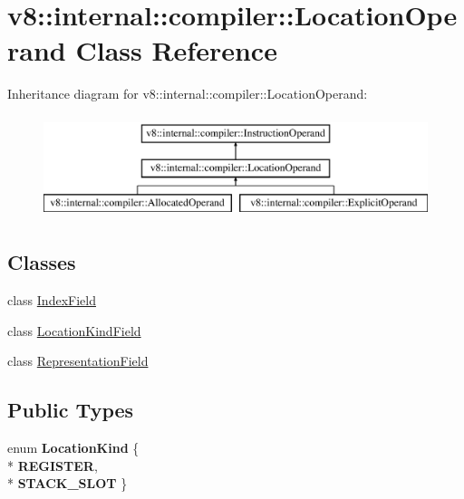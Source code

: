 \hypertarget{classv8_1_1internal_1_1compiler_1_1_location_operand}{}\section{v8\+:\+:internal\+:\+:compiler\+:\+:Location\+Operand Class Reference}
\label{classv8_1_1internal_1_1compiler_1_1_location_operand}
Inheritance diagram for v8\+:\+:internal\+:\+:compiler\+:\+:Location\+Operand\+:\begin{figure}[H]
\begin{center}
\leavevmode
\includegraphics[height=3.000000cm]{classv8_1_1internal_1_1compiler_1_1_location_operand}
\end{center}
\end{figure}
\subsection*{Classes}
\begin{DoxyCompactItemize}
\item 
class \hyperlink{classv8_1_1internal_1_1compiler_1_1_location_operand_1_1_index_field}{Index\+Field}
\item 
class \hyperlink{classv8_1_1internal_1_1compiler_1_1_location_operand_1_1_location_kind_field}{Location\+Kind\+Field}
\item 
class \hyperlink{classv8_1_1internal_1_1compiler_1_1_location_operand_1_1_representation_field}{Representation\+Field}
\end{DoxyCompactItemize}
\subsection*{Public Types}
\begin{DoxyCompactItemize}
\item 
enum {\bfseries Location\+Kind} \{ \\*
{\bfseries R\+E\+G\+I\+S\+T\+ER}, 
\\*
{\bfseries S\+T\+A\+C\+K\+\_\+\+S\+L\+OT}
 \}\hypertarget{classv8_1_1internal_1_1compiler_1_1_location_operand_af9e0a334eaf58a05f9ea5b7139221140}{}\label{classv8_1_1internal_1_1compiler_1_1_location_operand_af9e0a334eaf58a05f9ea5b7139221140}

\end{DoxyCompactItemize}
